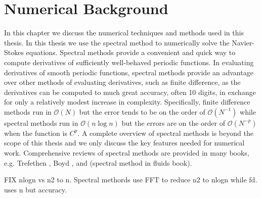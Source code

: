 \chapter{Numerical Background}

In this chapter we discuss the numerical techniques and methods used in this thesis. In this thesis we use the spectral method to numerically solve the Navier-Stokes equations. Spectral methods provide a convenient and quick way to compute derivatives of sufficiently well-behaved periodic functions. In evaluating derivatives of smooth periodic functions, spectral methods provide an advantage over other methods of evaluating derivatives, such as finite difference, as the derivatives can be computed to much great accuracy, often 10 digits, in exchange for only a relatively modest increase in complexity. Specifically, finite difference methods run in $\mathcal{O}(N)$ but the error tends to be on the order of $\mathcal{O}(N^{-1})$ while spectral methods run in $\mathcal{O}(n\log n)$ but the errors are on the order of $\mathcal{O}(N^{-p})$ when the function is $C^{p}$. A complete overview of spectral methods is beyond the scope of this thesis and we only discuss the key features needed for numerical work. Comprehensive reviews of spectral methods are provided in many books, e.g. Trefethen \cite{trefethen_spectral}, Boyd \cite{boyd2001}, and (spectral method in fluids book). 

FIX nlogn vs n2 to n. Spectral methords use FFT to reduce n2 to nlogn while fd. uses n but accuracy. 

